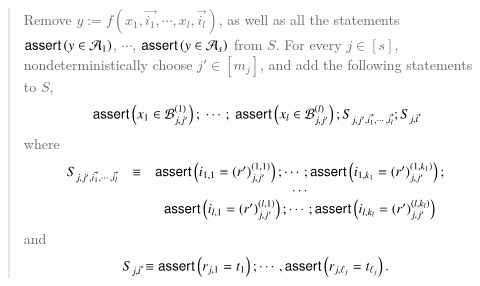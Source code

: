 \begin{quote}
Remove $y := f(x_1, \vec{i_1}, \cdots, x_l, \vec{i_l})$, as well as all the statements $\textsf{assert}\left(y \in \mathcal{A}_1\right)$, $\cdots$, $\textsf{assert}\left(y \in \mathcal{A}_s\right)$ from $S$. For every $j \in [s]$, nondeterministically choose $j' \in [m_j]$, and add the following statements to $S$, 
%
\[
\begin{array}{l}
\textsf{assert}\left(x_1 \in \mathcal{B}^{(1)}_{j, j'}\right);\ \cdots;\ \textsf{assert}\left(x_l \in \mathcal{B}^{(l)}_{j, j'}\right); S_{j, j', \vec{i_1}, \cdots, \vec{i_l}}; S_{j, \vec{t}}\\
\end{array}
\]
where 
\[
\begin{array}{l c c}
S_{j, j', \vec{i_1}, \cdots, \vec{i_l}} & \equiv & \textsf{assert}\left(i_{1,1} = (r')^{(1,1)}_{j, j'}\right); \cdots; \textsf{assert}\left(i_{1,k_1} = (r')^{(1,k_1)}_{j, j'}\right);\\
& & \cdots\\
 & & \textsf{assert}\left(i_{l,1} = (r')^{(l,1)}_{j, j'}\right); \cdots; \textsf{assert}\left(i_{l,k_l} = (r')^{(l,k_l)}_{j, j'}\right)
\end{array}
\]
and
\[
\begin{array}{l}
S_{j, \vec{t}} \equiv \textsf{assert}\left(r_{j, 1} = t_1\right); \cdots, \textsf{assert}\left(r_{j, \ell_j} = t_{\ell_j}\right).
\end{array}
\]
%
\end{quote}

\medskip
{}%

\smallskip

